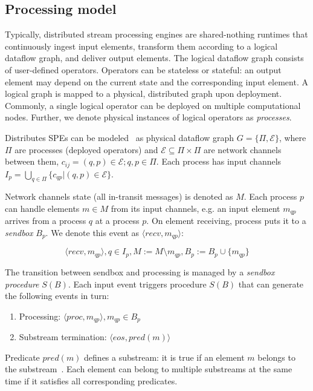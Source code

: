 \label{fs-acker-preliminaries}

\subsection{Processing model}

Typically, distributed stream processing engines are shared-nothing runtimes that continuously ingest input elements, transform them according to a logical dataflow graph, and deliver output elements. The logical dataflow graph consists of user-defined operators. Operators can be stateless or stateful: an output element may depend on the current state and the corresponding input element. A logical graph is mapped to a physical, distributed graph upon deployment. Commonly, a single logical operator can be deployed on multiple computational nodes. Further, we denote physical instances of logical operators as {\em processes}.

Distributes SPEs can be modeled~\cite{carbone2018scalable} as physical dataflow graph $G=\{\Pi,\mathcal{E}\}$, where $\Pi$ are processes (deployed operators) and $\mathcal{E} \subseteq \Pi \times \Pi$ are network channels between them, $c_{ij}=(q,p)\in \mathcal{E}; q,p \in \Pi$. Each process has input channels $I_p = \bigcup_{q \in \Pi} \{c_{qp} | (q,p) \in \mathcal{E}\}$.

Network channels state (all in-transit messages) is denoted as $M$. Each process $p$ can handle elements $m\in M$ from its input channels, e.g. an input element $m_{qp}$ arrives from a process $q$ at a process $p$. On element receiving, process puts it to a {\em sendbox} $B_p$. We denote this event as $\langle recv,m_{qp}\rangle$:

$$\langle recv,m_{qp}\rangle, q\in I_p, M:=M\setminus{m_{qp}}, B_p:=B_p\cup\{m_{qp}\}$$

The transition between sendbox and processing is managed by a {\em sendbox procedure} $S(B)$. Each input event triggers procedure $S(B)$ that can generate the following events in turn:

\begin{enumerate}
    \item Processing: $\langle proc,m_{qp}\rangle, m_{qp}\in B_p$
    \item Substream termination: $\langle eos,pred(m)\rangle$
\end{enumerate}

Predicate $pred(m)$ defines a substream: it is true if an element $m$ belongs to the substream~\cite{Tucker:2003:EPS:776752.776780}. Each element can belong to multiple substreams at the same time if it satisfies all corresponding predicates. 

